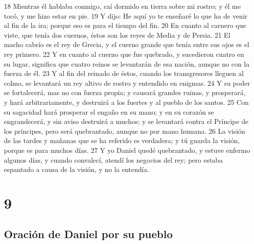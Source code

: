 18 Mientras él hablaba conmigo, caí dormido en tierra sobre mi rostro; y él me tocó, y me hizo estar en pie.
19 Y dijo: He aquí yo te enseñaré lo que ha de venir al fin de la ira; porque eso es para el tiempo del fin.
20 En cuanto al carnero que viste, que tenía dos cuernos, éstos son los reyes de Media y de Persia.
21 El macho cabrío es el rey de Grecia, y el cuerno grande que tenía entre sus ojos es el rey primero.
22 Y en cuanto al cuerno que fue quebrado, y sucedieron cuatro en su lugar, significa que cuatro reinos se levantarán de esa nación, aunque no con la fuerza de él.
23 Y al fin del reinado de éstos, cuando los transgresores lleguen al colmo, se levantará un rey altivo de rostro y entendido en enigmas.
24 Y su poder se fortalecerá, mas no con fuerza propia; y causará grandes ruinas, y prosperará, y hará arbitrariamente, y destruirá a los fuertes y al pueblo de los santos.
25 Con su sagacidad hará prosperar el engaño en su mano; y en su corazón se engrandecerá, y sin aviso destruirá a muchos; y se levantará contra el Príncipe de los príncipes, pero será quebrantado, aunque no por mano humana.
26 La visión de las tardes y mañanas que se ha referido es verdadera; y tú guarda la visión, porque es para muchos días.
27 Y yo Daniel quedé quebrantado, y estuve enfermo algunos días, y cuando convalecí, atendí los negocios del rey; pero estaba espantado a causa de la visión, y no la entendía.

\chapter{9}

\section*{Oración de Daniel por su pueblo}

